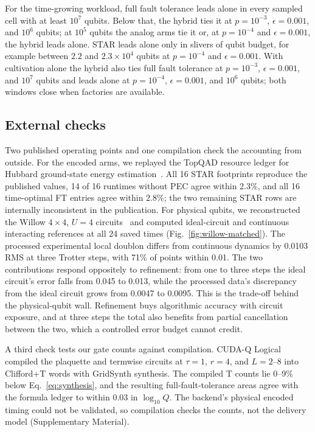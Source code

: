 \documentclass[11pt]{article}
\newcommand{\eps}{\epsilon}
\begin{document}
For the time-growing workload, full fault tolerance leads alone in every
sampled cell with at least $10^7$ qubits. Below that, the hybrid ties it at
$p=10^{-3}$, $\eps=0.001$, and $10^6$ qubits; at $10^5$ qubits the analog arms tie
it or, at $p=10^{-4}$ and $\eps=0.001$, the hybrid leads alone. STAR leads alone
only in slivers of qubit budget, for example between $2.2$ and $2.3\times10^4$
qubits at $p=10^{-4}$ and $\eps=0.001$. With cultivation alone the hybrid also ties
full fault tolerance at $p=10^{-3}$, $\eps=0.001$, and $10^7$ qubits and leads
alone at $p=10^{-4}$, $\eps=0.001$, and $10^6$ qubits; both windows close when
factories are available.

\subsection{External checks}\label{sec:external}
Two published operating points and one compilation check the accounting from
outside. For the
encoded arms, we replayed the TopQAD resource ledger for Hubbard ground-state
energy estimation~\cite{chung}. All 16 STAR footprints reproduce the published
values, 14 of 16 runtimes without PEC agree within 2.3\%, and all 16
time-optimal FT entries agree within 2.8\%; the two remaining STAR rows are
internally inconsistent in the publication. For physical qubits, we reconstructed
the Willow $4\times4$, $U=4$ circuits~\cite{phasecraftwillow2025,willowdata2025} and
computed ideal-circuit and continuous interacting references at all 24 saved
times (Fig.~\ref{fig:willow-matched}). The processed experimental local doublon
differs from continuous dynamics by 0.0103 RMS at three Trotter steps, with 71\%
of points within 0.01. The two contributions respond oppositely to refinement:
from one to three steps the ideal circuit's error falls from 0.045 to 0.013,
while the processed data's discrepancy from the ideal circuit grows from 0.0047
to 0.0095. This is the trade-off behind the physical-qubit wall. Refinement buys
algorithmic accuracy with circuit exposure, and at three steps the total also
benefits from partial cancellation between the two, which a controlled error
budget cannot credit.

A third check tests our gate counts against compilation. CUDA-Q
Logical~\cite{cudaqlogical} compiled the plaquette and termwise circuits at
$\tau=1$, $r=4$, and $L=2$--8 into Clifford+T words with GridSynth synthesis. The
compiled T counts lie 0--9\% below Eq.~\eqref{eq:synthesis}, and the resulting
full-fault-tolerance areas agree with the formula ledger to within 0.03 in
$\log_{10}Q$. The backend's physical encoded timing could not be validated,
so compilation checks the counts, not the delivery model (Supplementary
Material).
\end{document}
